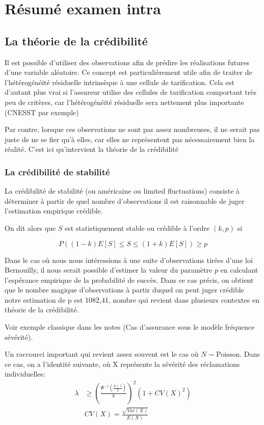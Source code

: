 \chapter{Résumé examen intra}

\section{La théorie de la crédibilité} 

Il est possible d'utiliser des observations afin de prédire les réalisations futures d'une variable aléatoire. Ce concept est particulièrement utile afin de traiter de l'hétérogénéité résiduelle intrinsèque à une cellule de tarification. Cela est d'autant plus vrai si l'assureur utilise des cellules de tarification comportant très peu de critères, car l'hétérogénéité résiduelle sera nettement plus importante (CNESST par exemple)

Par contre, lorsque ces observations ne sont pas assez nombreuses, il ne serait pas juste de ne se fier qu'à elles, car elles ne représentent pas nécessairement bien la réalité. C'est ici qu'intervient la théorie de la crédibilité

\subsection{La crédibilité de stabilité} 

La crédibilité  de stabilité (ou américaine ou limited fluctuations) consiste à déterminer à partir de quel nombre d'observations il est raisonnable de juger l'estimation empirique crédible.

On dit alors que $S$ est statistiquement stable ou crédible à l'ordre $(k,p)$ si

$$\boxed{P((1-k)E[S]\le S \le (1+k)E[S]) \ge p}$$

Dans le cas où nous nous intéressions à une suite d'observations tirées d'une loi Bernouilly, il nous serait possible d'estimer la valeur du paramètre $p$ en calculant l'espérance empirique de la probabilité de succès. Dans ce cas précis, on obtient que le nombre magique d'observations à partir duquel on peut juger crédible notre estimation de p est 1082,41, nombre qui revient dans plusieurs contextes en théorie de la crédibilité.

Voir exemple classique dans les notes (Cas d'assurance sous le modèle fréquence sévérité).

Un raccourci important qui revient assez souvent est le cas où $N \sim \text{Poisson}$. Dans ce cas, on a l'identité suivante, où X représente la sévérité des réclamations individuelles:
$$\boxed{\begin{aligned}
\lambda &\ge \left( \frac{\Phi^{-1}\left(\frac{p+1}{2}\right)}{k} \right)^2\left(1+ CV(X)^2 \right) \\
&CV(X) = \frac{\sqrt{Var(X)}}{E(X)}
\end{aligned}}$$

